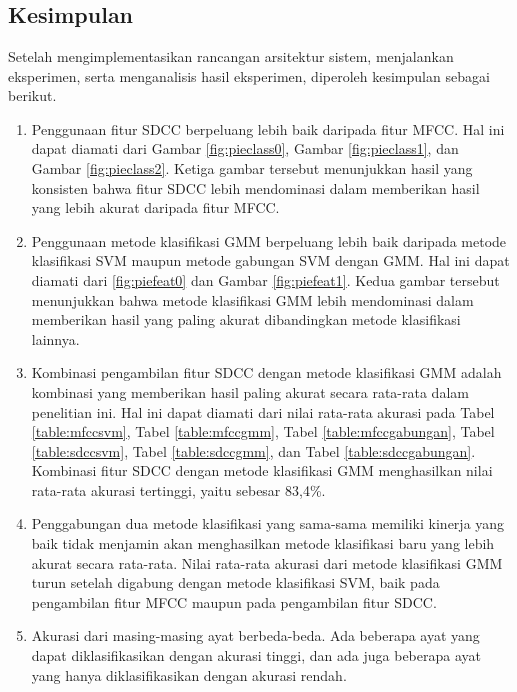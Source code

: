 \chapter{\babEnam}

\section{Kesimpulan}
Setelah mengimplementasikan rancangan arsitektur sistem, menjalankan eksperimen, serta menganalisis hasil eksperimen, diperoleh kesimpulan sebagai berikut.

\begin{enumerate}
  \item Penggunaan fitur SDCC berpeluang lebih baik daripada fitur MFCC. Hal ini dapat diamati dari Gambar \ref{fig:pieclass0}, Gambar \ref{fig:pieclass1}, dan Gambar \ref{fig:pieclass2}. Ketiga gambar tersebut menunjukkan hasil yang konsisten bahwa fitur SDCC lebih mendominasi dalam memberikan hasil yang lebih akurat daripada fitur MFCC.

  \item Penggunaan metode klasifikasi GMM berpeluang lebih baik daripada metode klasifikasi SVM maupun metode gabungan SVM dengan GMM. Hal ini dapat diamati dari \ref{fig:piefeat0} dan Gambar \ref{fig:piefeat1}. Kedua gambar tersebut menunjukkan bahwa metode klasifikasi GMM lebih mendominasi dalam memberikan hasil yang paling akurat dibandingkan metode klasifikasi lainnya.

  \item Kombinasi pengambilan fitur SDCC dengan metode klasifikasi GMM adalah kombinasi yang memberikan hasil paling akurat secara rata-rata dalam penelitian ini. Hal ini dapat diamati dari nilai rata-rata akurasi pada Tabel \ref{table:mfccsvm}, Tabel \ref{table:mfccgmm}, Tabel \ref{table:mfccgabungan}, Tabel \ref{table:sdccsvm}, Tabel \ref{table:sdccgmm}, dan Tabel \ref{table:sdccgabungan}. Kombinasi fitur SDCC dengan metode klasifikasi GMM menghasilkan nilai rata-rata akurasi tertinggi, yaitu sebesar 83,4\%.

  \item Penggabungan dua metode klasifikasi yang sama-sama memiliki kinerja yang baik tidak menjamin akan menghasilkan metode klasifikasi baru yang lebih akurat secara rata-rata. Nilai rata-rata akurasi dari metode klasifikasi GMM turun setelah digabung dengan metode klasifikasi SVM, baik pada pengambilan fitur MFCC maupun pada pengambilan fitur SDCC.

  \item Akurasi dari masing-masing ayat berbeda-beda. Ada beberapa ayat yang dapat diklasifikasikan dengan akurasi tinggi, dan ada juga beberapa ayat yang hanya diklasifikasikan dengan akurasi rendah.
\end{enumerate}

